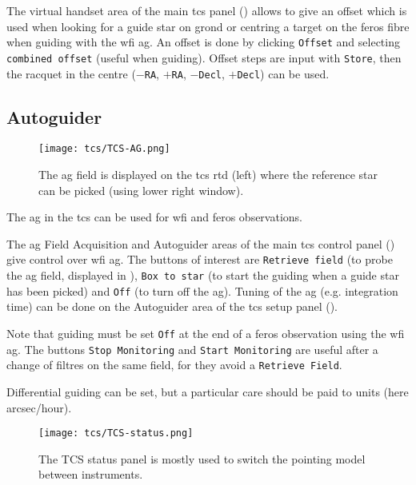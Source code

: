 \documentclass[11pt,fleqn,a4paper]{book}
\begin{document}
The virtual handset area of the main \gls{tcs} panel ()
allows to give an offset which is used when looking for a guide star on
\gls{grond} or centring a target on the \gls{feros} fibre when guiding with the
\gls{wfi} \gls{ag}.  An offset is done by clicking \texttt{Offset} and
selecting \texttt{combined offset} (useful when guiding).  Offset steps are
input with \texttt{Store}, then the racquet in the centre (\texttt{$-$RA},
\texttt{$+$RA}, \texttt{$-$Decl}, \texttt{$+$Decl}) can be used.

\subsection{Autoguider}
\label{autoguider}

\begin{figure}[!ht]
\centering
\texttt{[image: tcs/TCS-AG.png]}
\caption[WFI autoguider]{The \gls{ag} field is displayed on the \gls{tcs} \gls{rtd} (left) where the
 reference star can be picked (using lower right window).} 
\label{fig:tcsag}
\end{figure}
The \gls{ag} in the \gls{tcs} can be used for \gls{wfi} and \gls{feros} observations.

The \gls{ag} Field Acquisition and Autoguider areas of the main \gls{tcs}
control panel () give control over \gls{wfi} \gls{ag}.  The buttons
of interest are \texttt{Retrieve field} (to probe the \gls{ag} field, displayed
in ), \texttt{Box to star} (to start the guiding when a guide
star has been picked) and \texttt{Off} (to turn off the \gls{ag}).  Tuning of
the \gls{ag} (e.g. integration time) can be done on  the Autoguider area of the
\gls{tcs} setup panel ().

Note that guiding must be set \texttt{Off} at the end of a \gls{feros}
observation using the \gls{wfi} \gls{ag}. The buttons \texttt{Stop Monitoring}
and \texttt{Start Monitoring} are useful after a change of filtres on the same
field, for they avoid a \texttt{Retrieve Field}.

Differential guiding can be set, but a particular care should be paid
to units (here arcsec/hour).


\begin{figure}[!ht]
\centering
\texttt{[image: tcs/TCS-status.png]}
\caption[Status window of the telescope control software]{The \gls{TCS status panel} is mostly used to switch the \gls{pointing model}
between instruments.}
\label{fig:tcsstatus}
\end{figure}
\end{document}
